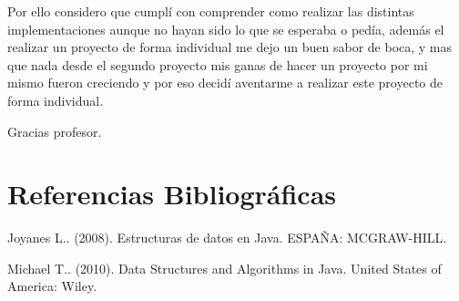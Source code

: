 \documentclass[12pt,a4paper]{article}
\begin{document}
Por ello considero que cumplí con comprender como realizar las distintas implementaciones aunque no hayan sido lo que se esperaba  o pedía, además el realizar un proyecto de forma individual me dejo un buen sabor de boca, y mas que nada desde el segundo proyecto mis ganas de hacer un proyecto por mi mismo fueron creciendo y  por eso decidí aventarme a realizar este proyecto de forma individual.

Gracias profesor.

	\section{Referencias Bibliográficas}
		\begin{thebibliography}{2}
			Joyanes L.. (2008). Estructuras de datos en Java. ESPAÑA: MCGRAW-HILL.
			
			Michael T.. (2010). Data Structures and Algorithms in Java. United States of America: Wiley.
		\end{thebibliography}
	
	
	
	
	
	
	
	
	
	
\end{document}

